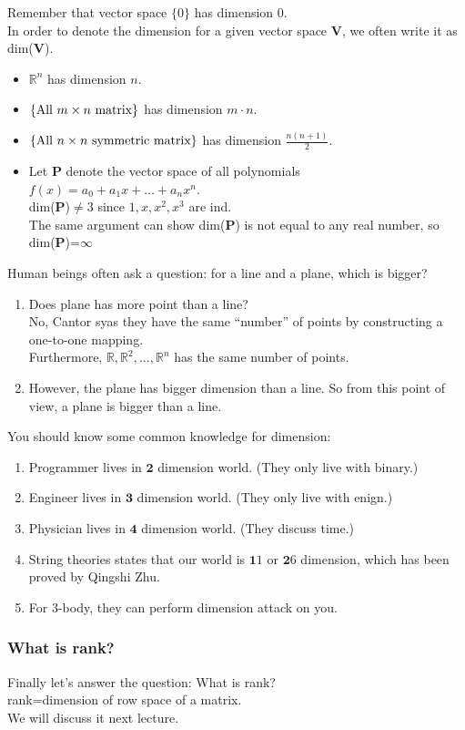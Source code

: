 \begin{remark}
Remember that vector space $\{0\}$ has dimension $0$.\\In order to denote the dimension for a given vector space $\bm V$, we often write it as dim($\bm V$).
\end{remark}
\begin{example}
\begin{itemize}
\item
$\mathbb{R}^{n}$ has dimension $n$.
\item
$\{\text{All $m\times n$ matrix}\}$ has dimension $m\cdot n$.
\item
$\{\text{All $n\times n$ symmetric matrix}\}$ has dimension $\frac{n(n+1)}{2}$.
\item
Let $\bm P$ denote the vector space of all polynomials $f(x) = a_0+a_1x+\dots+a_nx^n$.\\
dim($\bm P$)$\ne 3$ since $1,x,x^2,x^3$ are ind.\\
The same argument can show dim($\bm P$) is not equal to any real number, so dim($\bm P$)=$\infty$
\end{itemize}
\end{example}
Human beings often ask a question: for a line and a plane, which is bigger?
\begin{enumerate}
\item
Does plane has more point than a line?\\
No, Cantor syas they have the same ``number'' of points by constructing a one-to-one mapping.\\
Furthermore, $\mathbb{R},\mathbb{R}^2,\dots,\mathbb{R}^n$ has the same number of points.
\item
However, the plane has bigger dimension than a line. So from this point of view, a plane is bigger than a line.
\end{enumerate}
You should know some common knowledge for dimension:
\begin{enumerate}
\item
Programmer lives in $\bm 2$ dimension world. (They only live with binary.)
\item
Engineer lives in $\bm 3$ dimension world. (They only live with enign.)
\item
Physician lives in $\bm 4$ dimension world. (They discuss time.)
\item
String theories states that our world is $\bm 11$ or $\bm 26$ dimension, which has been proved by Qingshi Zhu.
\item
For 3-body, they can perform dimension attack on you.
\end{enumerate}
\subsubsection{What is rank?}
Finally let's answer the question: What is rank?\\
rank=dimension of row space of a matrix.\\
We will discuss it next lecture.





















